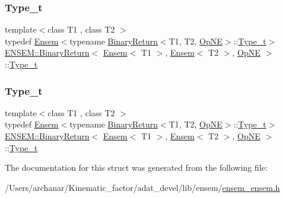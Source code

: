 \subsubsection{\texorpdfstring{Type\_t}{Type\_t}\hspace{0.1cm}{\footnotesize\ttfamily [1/2]}}
{\footnotesize\ttfamily template$<$class T1 , class T2 $>$ \\
typedef \mbox{\hyperlink{classENSEM_1_1Ensem}{Ensem}}$<$typename \mbox{\hyperlink{structENSEM_1_1BinaryReturn}{Binary\+Return}}$<$T1, T2, \mbox{\hyperlink{structENSEM_1_1OpNE}{Op\+NE}}$>$\+::\mbox{\hyperlink{structENSEM_1_1BinaryReturn_3_01Ensem_3_01T1_01_4_00_01Ensem_3_01T2_01_4_00_01OpNE_01_4_a138a0a892edf84683f03f6b723474dae}{Type\+\_\+t}}$>$ \mbox{\hyperlink{structENSEM_1_1BinaryReturn}{E\+N\+S\+E\+M\+::\+Binary\+Return}}$<$ \mbox{\hyperlink{classENSEM_1_1Ensem}{Ensem}}$<$ T1 $>$, \mbox{\hyperlink{classENSEM_1_1Ensem}{Ensem}}$<$ T2 $>$, \mbox{\hyperlink{structENSEM_1_1OpNE}{Op\+NE}} $>$\+::\mbox{\hyperlink{structENSEM_1_1BinaryReturn_3_01Ensem_3_01T1_01_4_00_01Ensem_3_01T2_01_4_00_01OpNE_01_4_a138a0a892edf84683f03f6b723474dae}{Type\+\_\+t}}}

\mbox{\label{structENSEM_1_1BinaryReturn_3_01Ensem_3_01T1_01_4_00_01Ensem_3_01T2_01_4_00_01OpNE_01_4_a138a0a892edf84683f03f6b723474dae}} 
\subsubsection{\texorpdfstring{Type\_t}{Type\_t}\hspace{0.1cm}{\footnotesize\ttfamily [2/2]}}
{\footnotesize\ttfamily template$<$class T1 , class T2 $>$ \\
typedef \mbox{\hyperlink{classENSEM_1_1Ensem}{Ensem}}$<$typename \mbox{\hyperlink{structENSEM_1_1BinaryReturn}{Binary\+Return}}$<$T1, T2, \mbox{\hyperlink{structENSEM_1_1OpNE}{Op\+NE}}$>$\+::\mbox{\hyperlink{structENSEM_1_1BinaryReturn_3_01Ensem_3_01T1_01_4_00_01Ensem_3_01T2_01_4_00_01OpNE_01_4_a138a0a892edf84683f03f6b723474dae}{Type\+\_\+t}}$>$ \mbox{\hyperlink{structENSEM_1_1BinaryReturn}{E\+N\+S\+E\+M\+::\+Binary\+Return}}$<$ \mbox{\hyperlink{classENSEM_1_1Ensem}{Ensem}}$<$ T1 $>$, \mbox{\hyperlink{classENSEM_1_1Ensem}{Ensem}}$<$ T2 $>$, \mbox{\hyperlink{structENSEM_1_1OpNE}{Op\+NE}} $>$\+::\mbox{\hyperlink{structENSEM_1_1BinaryReturn_3_01Ensem_3_01T1_01_4_00_01Ensem_3_01T2_01_4_00_01OpNE_01_4_a138a0a892edf84683f03f6b723474dae}{Type\+\_\+t}}}



The documentation for this struct was generated from the following file\+:\begin{DoxyCompactItemize}
\item 
/\+Users/archanar/\+Kinematic\+\_\+factor/adat\+\_\+devel/lib/ensem/\mbox{\hyperlink{lib_2ensem_2ensem__ensem_8h}{ensem\+\_\+ensem.\+h}}\end{DoxyCompactItemize}
